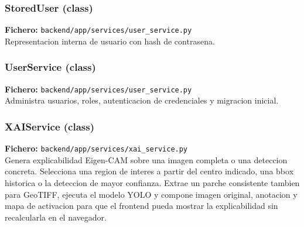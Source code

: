 \subsubsection*{StoredUser (class)}
\noindent\textbf{Fichero:} \texttt{backend/app/services/user\_service.py}\\
Representacion interna de usuario con hash de contrasena.


\subsubsection*{UserService (class)}
\noindent\textbf{Fichero:} \texttt{backend/app/services/user\_service.py}\\
Administra usuarios, roles, autenticacion de credenciales y migracion inicial.


\subsubsection*{XAIService (class)}
\noindent\textbf{Fichero:} \texttt{backend/app/services/xai\_service.py}\\
Genera explicabilidad Eigen-CAM sobre una imagen completa o una deteccion concreta. Selecciona una region de interes a partir del centro indicado, una bbox historica o la deteccion de mayor confianza. Extrae un parche consistente tambien para GeoTIFF, ejecuta el modelo YOLO y compone imagen original, anotacion y mapa de activacion para que el frontend pueda mostrar la explicabilidad sin recalcularla en el navegador.


